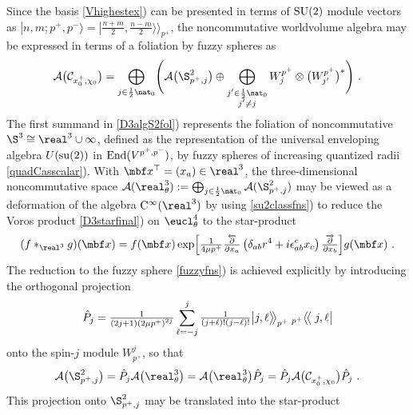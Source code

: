 Since the basis \eqref{Vhighestex}) can be presented in terms of ${\rm
  SU}(2)$ module vectors as
$|n,m;p^+,p^-\rangle=|\frac{n+m}2,\frac{n-m}2 \rangle\!\rangle_{p^+}$, the
noncommutative worldvolume algebra may be expressed in terms of a
foliation by fuzzy spheres as
\begin{equation}
\mathcal{A}\bigl(\mathcal{C}_{x_0^+,\chi_0}\bigr)=
\bigoplus_{j\in\frac12 \nat_0}\Biggl(\mathcal{A}\bigl(\S^2_{p^+,j}\bigr)
{} \oplus \bigoplus_{\stackrel{\scriptstyle j'\in\frac12 \nat_0}
{\scriptstyle j'\neq j}}W_j^{p^+}\otimes\bigl(W_{j'}^{p^+}\bigr)^*
\Biggr) \ .
\label{D3algS2fol}\end{equation}
The first summand in \eqref{D3algS2fol}) represents the foliation of
noncommutative $\S^3\cong\real^3\cup\infty$, defined as the representation of
the universal enveloping algebra $U({\rm su}(2))$ in ${\rm End}(V^{p^+,p^-})$,
by fuzzy spheres of increasing quantized radii \eqref{quadCasscalar}). With
$\mbf x^\top=(x_a)\in\real^3$, the three-dimensional noncommutative space
$\mathcal{A}(\real_\theta^3):=
\bigoplus_{j\in\frac12 \nat_0}\mathcal{A}(\S^2_{p^+,j})$ may be
viewed as a deformation of the algebra ${\rm C}^\infty(\real^3)$ by
using \eqref{su2classfns}) to reduce the Voros product
\eqref{D3starfinal}) on $\eucl_\theta^4$ to the
star-product \cite{HLS-J1}
\begin{equation}
(f*_{\real^3}g)(\mbf x)=f(\mbf x) \exp\Bigl[\mbox{$\frac1{4\mu p^+}$} 
\mbox{$\frac{\overleftarrow{\partial}}{\partial x_a}$} \left(
\delta_{ab} r^4+ i\epsilon_{ab}^{   c} x_c\right) 
\mbox{$\frac{\overrightarrow{\partial}}{\partial x_b}$} \Bigr] 
g(\mbf x) \ .
\label{starprodR3}\end{equation}
The reduction to the fuzzy sphere \eqref{fuzzyfns}) is achieved explicitly by
introducing the orthogonal projection
\begin{equation}
\hat P_j=\mbox{$\frac1{(2j+1) \left(2\mu p^+\right)^{2j}}$} 
\sum_{\ell=-j}^j\mbox{$\frac1{(j+\ell)! (j-\ell)!}$} 
\bigl|j,\ell \bigr\rangle\!\!\!
\bigm\rangle_{p^+} {}_{p^+}\bigl\langle\!
\bigm\langle j,\ell \bigr|
\label{projspinj}\end{equation}
onto the spin-$j$ module $W_{p^+}^j$, so that
\begin{equation}
\mathcal{A}\bigl(\S^2_{p^+,j}\bigr)=\hat P_j\mathcal{A}\bigl
(\real_\theta^3\bigr)=\mathcal{A}\bigl
(\real_\theta^3\bigr)\hat P_j=\hat P_j\mathcal{A}\bigl(
\mathcal{C}_{x_0^+,\chi_0}\bigr)\hat P_j \ .
\label{fuzzyalgproj}\end{equation}
This projection onto $\S^2_{p^+,j}$ may be translated into the star-product
